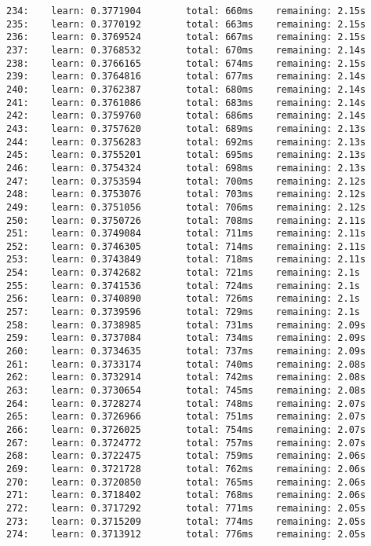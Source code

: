 \documentclass[11pt]{article}
\begin{document}
\begin{Verbatim}[commandchars=\\\{\}]
234:    learn: 0.3771904        total: 660ms    remaining: 2.15s
235:    learn: 0.3770192        total: 663ms    remaining: 2.15s
236:    learn: 0.3769524        total: 667ms    remaining: 2.15s
237:    learn: 0.3768532        total: 670ms    remaining: 2.14s
238:    learn: 0.3766165        total: 674ms    remaining: 2.15s
239:    learn: 0.3764816        total: 677ms    remaining: 2.14s
240:    learn: 0.3762387        total: 680ms    remaining: 2.14s
241:    learn: 0.3761086        total: 683ms    remaining: 2.14s
242:    learn: 0.3759760        total: 686ms    remaining: 2.14s
243:    learn: 0.3757620        total: 689ms    remaining: 2.13s
244:    learn: 0.3756283        total: 692ms    remaining: 2.13s
245:    learn: 0.3755201        total: 695ms    remaining: 2.13s
246:    learn: 0.3754324        total: 698ms    remaining: 2.13s
247:    learn: 0.3753594        total: 700ms    remaining: 2.12s
248:    learn: 0.3753076        total: 703ms    remaining: 2.12s
249:    learn: 0.3751056        total: 706ms    remaining: 2.12s
250:    learn: 0.3750726        total: 708ms    remaining: 2.11s
251:    learn: 0.3749084        total: 711ms    remaining: 2.11s
252:    learn: 0.3746305        total: 714ms    remaining: 2.11s
253:    learn: 0.3743849        total: 718ms    remaining: 2.11s
254:    learn: 0.3742682        total: 721ms    remaining: 2.1s
255:    learn: 0.3741536        total: 724ms    remaining: 2.1s
256:    learn: 0.3740890        total: 726ms    remaining: 2.1s
257:    learn: 0.3739596        total: 729ms    remaining: 2.1s
258:    learn: 0.3738985        total: 731ms    remaining: 2.09s
259:    learn: 0.3737084        total: 734ms    remaining: 2.09s
260:    learn: 0.3734635        total: 737ms    remaining: 2.09s
261:    learn: 0.3733174        total: 740ms    remaining: 2.08s
262:    learn: 0.3732914        total: 742ms    remaining: 2.08s
263:    learn: 0.3730654        total: 745ms    remaining: 2.08s
264:    learn: 0.3728274        total: 748ms    remaining: 2.07s
265:    learn: 0.3726966        total: 751ms    remaining: 2.07s
266:    learn: 0.3726025        total: 754ms    remaining: 2.07s
267:    learn: 0.3724772        total: 757ms    remaining: 2.07s
268:    learn: 0.3722475        total: 759ms    remaining: 2.06s
269:    learn: 0.3721728        total: 762ms    remaining: 2.06s
270:    learn: 0.3720850        total: 765ms    remaining: 2.06s
271:    learn: 0.3718402        total: 768ms    remaining: 2.06s
272:    learn: 0.3717292        total: 771ms    remaining: 2.05s
273:    learn: 0.3715209        total: 774ms    remaining: 2.05s
274:    learn: 0.3713912        total: 776ms    remaining: 2.05s

\end{Verbatim}
\end{document}
